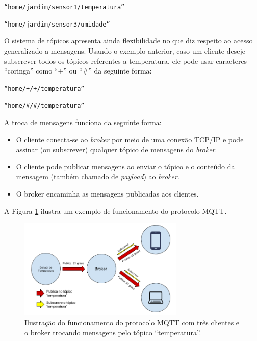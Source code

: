 \begin{center}
    \texttt{“home/jardim/sensor1/temperatura”}
    
    \texttt{“home/jardim/sensor3/umidade”}
\end{center}

O sistema de tópicos apresenta ainda flexibilidade no que diz respeito ao acesso generalizado a mensagens. Usando o exemplo anterior, caso um cliente deseje subscrever todos os tópicos referentes a temperatura, ele pode usar caracteres “coringa” como “+” ou “\#” da seguinte forma:

\begin{center}
    \texttt{“home/+/+/temperatura”}
    
    \texttt{“home/\#/\#/temperatura”}
\end{center}

A troca de mensagens funciona da seguinte forma:
\begin{itemize}
    \item[1 -] O cliente conecta-se ao \textit{broker} por meio de uma conexão TCP/IP e pode assinar (ou subscrever) qualquer tópico de mensagens do \textit{broker}.
    \item[2 -] O cliente pode publicar mensagens ao enviar o tópico e o conteúdo da mensagem (também chamado de \textit{payload}) ao \textit{broker}.
    \item[3 -] O broker encaminha as mensagens publicadas aos clientes.
\end{itemize}
A Figura \ref{mqtt} ilustra um exemplo de funcionamento do protocolo MQTT.
\begin{figure}[ht]
    \begin{center}
    \includegraphics[width=0.7\textwidth]{figuras/mqtt.PNG}
    \end{center}
    \caption[Ilustração do funcionamento do protocolo MQTT.]{Ilustração do funcionamento do protocolo MQTT com três clientes e o broker trocando mensagens pelo tópico ``temperatura''.}
    \label{mqtt}
\end{figure}


